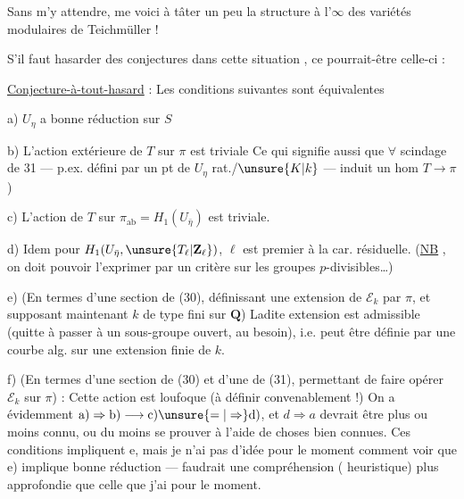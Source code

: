 Sans m'y attendre, me voici à tâter un peu la structure à l'$\infty$ des variétés modulaires de Teichmüller !

S'il faut hasarder des conjectures dans cette situation , ce pourrait-être celle-ci :

\uline{Conjecture-à-tout-hasard} : Les conditions suivantes sont équivalentes

\noindent a) $U_\eta$ a bonne réduction sur $S$

\noindent b) L'action extérieure de $T$ sur $\pi$ est triviale
Ce qui signifie aussi que $\forall$  scindage de 31 --- p.ex. défini par un pt de $U_\eta$ rat./$\unsure{K|k}$ --- induit un hom $T\longrightarrow\pi$)

\noindent c) L'action de $T$ sur $\pi_{\mathrm{ab}}=H_1(U_{\bar\eta})$ est triviale.

\noindent d) Idem pour $H_1(U_{\bar\eta},\unsure{T_\ell|\mathbf Z_\ell})$,  $\ell$ est premier à la car. résiduelle. (\uline{NB}  , on doit pouvoir l'exprimer par un critère sur les groupes $p$-divisibles\ldots)

\noindent e) (En termes d'une section de (30), définissant une extension de $\mathcal E_k$ par $\pi$, et supposant maintenant $k$ de type fini sur $\mathbf Q$) Ladite extension est admissible (quitte à passer à un sous-groupe ouvert,  au besoin), i.e. peut être définie par une courbe alg. sur  une extension finie de $k$.

\noindent f) (En termes d'une section de (30) et d'une de (31), permettant de faire opérer $\mathcal E_k$ sur $\pi$) : Cette action est  loufoque (à définir convenablement !)
On a évidemment $\mathrm{a)}\Rightarrow\mathrm{b)}\longrightarrow\mathrm{c)}\unsure{=|\Rightarrow}\mathrm{d)}$, et $d\Rightarrow a$ devrait être plus ou moins connu, ou du moins se prouver à l'aide de choses bien connues. Ces conditions impliquent e, mais je n'ai pas d'idée pour le moment comment voir que e) implique bonne réduction --- faudrait une compréhension ( heuristique) plus approfondie que celle que j'ai pour le moment.

